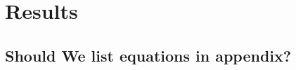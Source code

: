 \documentclass[10pt,a4paper]{article}
\begin{document}
\section{Results}
\label{sec:Results}





\clearpage
\begin{appendices}
\appendix
\section{Should We list equations in appendix?}
\end{appendices}
\end{document}

